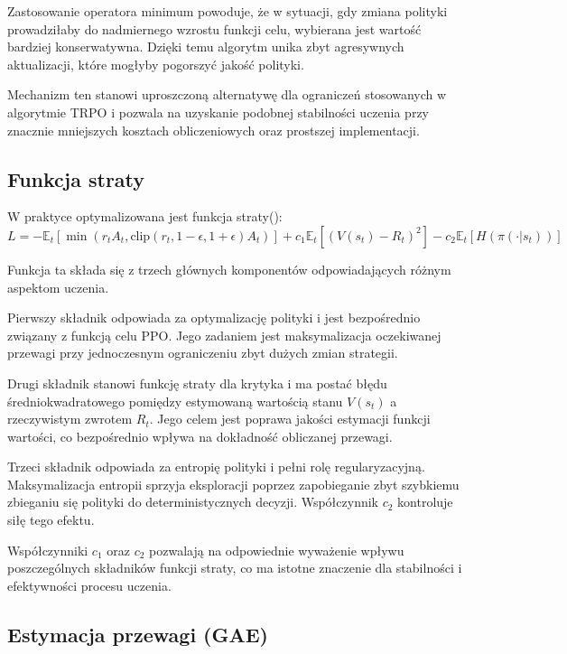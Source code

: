 \documentclass[12pt,twoside]{article}
\begin{document}
Zastosowanie operatora minimum powoduje, że w sytuacji, gdy zmiana polityki prowadziłaby do nadmiernego wzrostu funkcji celu, wybierana jest wartość bardziej konserwatywna. Dzięki temu algorytm unika zbyt agresywnych aktualizacji, które mogłyby pogorszyć jakość polityki.

Mechanizm ten stanowi uproszczoną alternatywę dla ograniczeń stosowanych w algorytmie TRPO i pozwala na uzyskanie podobnej stabilności uczenia przy znacznie mniejszych kosztach obliczeniowych oraz prostszej implementacji.



\subsection{Funkcja straty}

W praktyce optymalizowana jest funkcja straty(\cite{str11}):
\[
L = - \mathbb{E}_t \left[
\min(r_t A_t, \text{clip}(r_t, 1-\epsilon, 1+\epsilon) A_t)
\right]
+ c_1 \mathbb{E}_t \left[ (V(s_t) - R_t)^2 \right]
- c_2 \mathbb{E}_t [H(\pi(\cdot|s_t))]
\]

Funkcja ta składa się z trzech głównych komponentów odpowiadających różnym aspektom uczenia.

Pierwszy składnik odpowiada za optymalizację polityki i jest bezpośrednio związany z funkcją celu PPO. Jego zadaniem jest maksymalizacja oczekiwanej przewagi przy jednoczesnym ograniczeniu zbyt dużych zmian strategii.

Drugi składnik stanowi funkcję straty dla krytyka i ma postać błędu średniokwadratowego pomiędzy estymowaną wartością stanu $V(s_t)$ a rzeczywistym zwrotem $R_t$. Jego celem jest poprawa jakości estymacji funkcji wartości, co bezpośrednio wpływa na dokładność obliczanej przewagi.

Trzeci składnik odpowiada za entropię polityki i pełni rolę regularyzacyjną. Maksymalizacja entropii sprzyja eksploracji poprzez zapobieganie zbyt szybkiemu zbieganiu się polityki do deterministycznych decyzji. Współczynnik $c_2$ kontroluje siłę tego efektu.

Współczynniki $c_1$ oraz $c_2$ pozwalają na odpowiednie wyważenie wpływu poszczególnych składników funkcji straty, co ma istotne znaczenie dla stabilności i efektywności procesu uczenia.



\subsection{Estymacja przewagi (GAE)}
\end{document}
